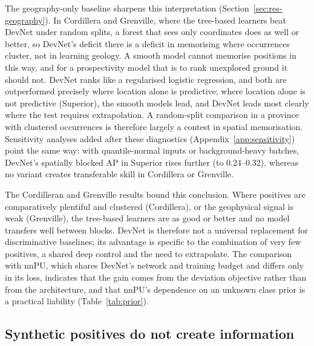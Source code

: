 \documentclass[pdflatex,sn-apa]{sn-jnl}
\begin{document}
The geography-only baseline sharpens this interpretation (Section~\ref{sec:res-geography}). In Cordillera and Grenville, where the tree-based learners beat DevNet under random splits, a forest that sees only coordinates does as well or better, so DevNet's deficit there is a deficit in memorising where occurrences cluster, not in learning geology. A smooth model cannot memorise positions in this way, and for a prospectivity model that is to rank unexplored ground it should not. DevNet ranks like a regularised logistic regression, and both are outperformed precisely where location alone is predictive; where location alone is not predictive (Superior), the smooth models lead, and DevNet leads most clearly where the test requires extrapolation. A random-split comparison in a province with clustered occurrences is therefore largely a contest in spatial memorisation. Sensitivity analyses added after these diagnostics (Appendix~\ref{app:sensitivity}) point the same way: with quantile-normal inputs or background-heavy batches, DevNet's spatially blocked AP in Superior rises further (to 0.24--0.32), whereas no variant creates transferable skill in Cordillera or Grenville.

The Cordilleran and Grenville results bound this conclusion. Where positives are comparatively plentiful and clustered (Cordillera), or the geophysical signal is weak (Grenville), the tree-based learners are as good or better and no model transfers well between blocks. DevNet is therefore not a universal replacement for discriminative baselines; its advantage is specific to the combination of very few positives, a shared deep control and the need to extrapolate. The comparison with nnPU, which shares DevNet's network and training budget and differs only in its loss, indicates that the gain comes from the deviation objective rather than from the architecture, and that nnPU's dependence on an unknown class prior is a practical liability (Table~\ref{tab:prior}).

\subsection{Synthetic positives do not create information}\label{sec:disc-gan}
\end{document}
